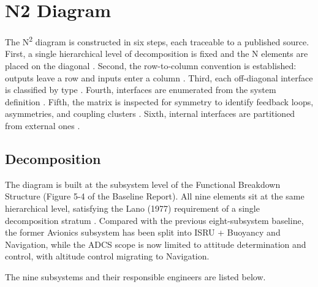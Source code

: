 \chapter{N2 Diagram}
\label{chap:n2}

The N\textsuperscript{2} diagram is constructed in six steps, each traceable to a published source. First, a single hierarchical level of decomposition is fixed and the N elements are placed on the diagonal \cite{lano1977,nasaappf}. Second, the row-to-column convention is established: outputs leave a row and inputs enter a column \cite{lano1977,incose2023}. Third, each off-diagonal interface is classified by type \cite{nasaappf}. Fourth, interfaces are enumerated from the system definition \cite{lano1977}. Fifth, the matrix is inspected for symmetry to identify feedback loops, asymmetries, and coupling clusters \cite{steward1981,eppinger1994,deweck2015,becker2000}. Sixth, internal interfaces are partitioned from external ones \cite{lano1977,sicsa2016}.

\section{Decomposition}

The diagram is built at the subsystem level of the Functional Breakdown Structure (Figure 5-4 of the Baseline Report). All nine elements sit at the same hierarchical level, satisfying the Lano (1977) requirement of a single decomposition stratum \cite{lano1977}. Compared with the previous eight-subsystem baseline, the former Avionics subsystem has been split into ISRU + Buoyancy and Navigation, while the ADCS scope is now limited to attitude determination and control, with altitude control migrating to Navigation.

The nine subsystems and their responsible engineers are listed below.

